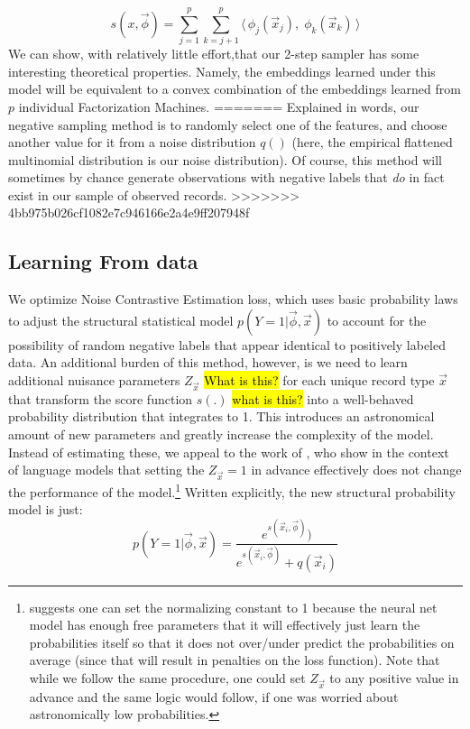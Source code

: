 \documentclass{article} %
\newcommand{\vect}[1]{\vec{#1}}
\renewcommand{\cite}[1]{\citep{#1}}
\begin{document}
\[
s(x,\vec{\phi}) =
\sum_{j =1}^p \sum_{k=j+1}^{p}   \bigl\langle \,  \phi_j( \vect{x}_{j}), \; \phi_k( \vect{x}_{k}) \, \bigr\rangle
\]
We can show, with relatively little effort,that our 2-step sampler has some interesting theoretical properties. Namely, the embeddings learned under this model will be equivalent to a convex combination of the embeddings learned from $p$ individual Factorization Machines.
=======
Explained in words, our negative sampling method is to randomly select one of the features, and choose another value for it from a noise distribution $q()$ (here, the empirical flattened multinomial distribution is our noise distribution). Of course, this method will sometimes by chance generate observations with negative labels that \textit{do} in fact exist in our sample of observed records.
>>>>>>> 4bb975b026cf1082e7c946166e2a4e9ff207948f

\subsection{Learning From data}
\label{sec:learning}

We optimize Noise Contrastive Estimation\cite{nce} loss, which uses basic probability laws to adjust the structural statistical model $p(Y=1|\vec{\phi},\vec{x})$ to account for the possibility of random negative labels that appear identical to positively labeled data. An additional burden of this method, however, is we need to learn additional nuisance parameters $Z_{\vec{x}}$ \hl{What is this?} for each unique record type $\vec{x}$ that transform the score function $s(.)$ \hl{what is this?} into a well-behaved probability distribution that integrates to 1. This introduces an astronomical amount of new parameters and greatly increase the complexity of the model. Instead of estimating these, we appeal to the work of \cite{fastnnlang}, who show in the context of language models that setting the $Z_{\vec{x}}=1$ in advance effectively does not change the performance of the model.\footnote{\cite{fastnnlang} suggests one can set the normalizing constant to 1 because the neural net model has enough free parameters that it will effectively just learn the probabilities itself so that it does not over/under predict the probabilities on average (since that will result in penalties on the loss function). Note that while we follow the same procedure, one could set $Z_{\vec{x}}$ to any positive value in advance and the same logic would follow, if one was worried about astronomically low probabilities.}  Written explicitly, the new structural probability model is just:
\begin{equation}
p(Y=1|\vec{\phi},\vec{x}) = \frac{e^{s(\vec{x}_i,\vec{\phi}) })}{e^{s(\vec{x}_i,\vec{\phi}) } + q(\vec{x}_i) }
\end{equation}
\end{document}
